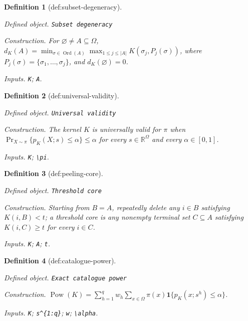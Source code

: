 \documentclass{article}
\newtheorem{definition}{Definition}
\begin{document}
\begin{definition}[def:subset-degeneracy]\label{def:subset-degeneracy}
\par\smallskip\noindent\emph{Defined object.} \texttt{Subset degeneracy}
\par\smallskip\noindent\emph{Construction.} For \(\varnothing\neq A\subseteq\Omega\), \(d_K(A)=\min_{\sigma\in\operatorname{Ord}(A)}\max_{1\leq j\leq|A|}K(\sigma_j,P_j(\sigma))\), where \(P_j(\sigma)=\{\sigma_1,\ldots,\sigma_j\}\), and \(d_K(\varnothing)=0\).
\par\smallskip\noindent\emph{Inputs.} \texttt{K}; \texttt{A}.
\end{definition}

\begin{definition}[def:universal-validity]\label{def:universal-validity}
\par\smallskip\noindent\emph{Defined object.} \texttt{Universal validity}
\par\smallskip\noindent\emph{Construction.} The kernel \(K\) is universally valid for \(\pi\) when \(\Pr_{X\sim\pi}\{p_K(X;s)\leq\alpha\}\leq\alpha\) for every \(s\in\mathbb{R}^{\Omega}\) and every \(\alpha\in[0,1]\).
\par\smallskip\noindent\emph{Inputs.} \texttt{K}; \texttt{\textbackslash{}\allowbreak{}pi}.
\end{definition}

\begin{definition}[def:peeling-core]\label{def:peeling-core}
\par\smallskip\noindent\emph{Defined object.} \texttt{Threshold core}
\par\smallskip\noindent\emph{Construction.} Starting from \(B=A\), repeatedly delete any \(i\in B\) satisfying \(K(i,B)<t\); a threshold core is any nonempty terminal set \(C\subseteq A\) satisfying \(K(i,C)\geq t\) for every \(i\in C\).
\par\smallskip\noindent\emph{Inputs.} \texttt{K}; \texttt{A}; \texttt{t}.
\end{definition}

\begin{definition}[def:catalogue-power]\label{def:catalogue-power}
\par\smallskip\noindent\emph{Defined object.} \texttt{Exact catalogue power}
\par\smallskip\noindent\emph{Construction.} \(\operatorname{Pow}(K)=\sum_{h=1}^{q}w_h\sum_{x\in\Omega}\pi(x)\mathbf{1}\{p_K(x;s^h)\leq\alpha\}\).
\par\smallskip\noindent\emph{Inputs.} \texttt{K}; \texttt{s\textasciicircum{}\{1:\allowbreak{}q\}\allowbreak{}}; \texttt{w}; \texttt{\textbackslash{}\allowbreak{}alpha}.
\end{definition}
\end{document}
